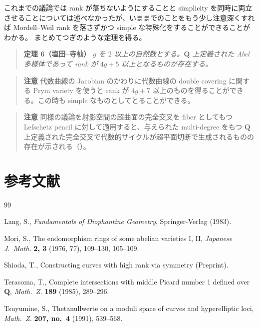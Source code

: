 \documentclass[uplatex,dvipdfmx]{jlreq}
\def\inbook#1{\textit{#1}}
\def\publ#1{#1}
\begin{document}
これまでの議論では rank が落ちないようにすることと simplicity を同時に両立させることについては述べなかったが、いままでのことをもう少し注意深くすれば Mordell--Weil rank を落さずかつ simple な特殊化をすることができることがわかる。
まとめてつぎのような定理を得る。

\begin{quote}
\textbf{定理 6（塩田--寺杣）}\quad
\textit{$g$ を $2$ 以上の自然数とする。$\mathbf{Q}$ 上定義された Abel 多様体であって rank が $4g + 5$ 以上となるものが存在する。}
\end{quote}

\begin{quote}
\textbf{注意}\quad
代数曲線の Jacobian のかわりに代数曲線の double covering に関する Prym variety を使うと rank が $4g + 7$ 以上のものを得ることができる。この時も simple なものとしてとることができる。
\end{quote}

\begin{quote}
\textbf{注意}\quad
同様の議論を射影空間の超曲面の完全交叉を fiber としてもつ Lefschetz pencil に対して適用すると、与えられた multi-degree をもつ $\mathbf{Q}$ 上定義された完全交叉で代数的サイクルが超平面切断で生成されるものの存在が示される（\cite{T}）。
\end{quote}


\section*{参考文献}

\begin{thebibliography}{99}

  Lang, S.,
  \inbook{Fundamentals of Diophantine Geometry},
  \publ{Springer-Verlag} (1983).

  Mori, S.,
  The endomorphism rings of some abelian varieties I, II,
  \textit{Japanese J.\ Math.}
  \textbf{2, 3} (1976, 77), 109--130, 105--109.

  Shioda, T.,
  Constructing curves with high rank via symmetry
  (Preprint).

  Terasoma, T.,
  Complete intersections with middle Picard number 1 defined over $\mathbf{Q}$,
  \textit{Math.\ Z.}
  \textbf{189} (1985), 289--296.

  Tsuyumine, S.,
  Thetanullwerte on a moduli space of curves and hyperelliptic loci,
  \textit{Math.\ Z.}
  \textbf{207, no.\ 4} (1991), 539--568.

\end{thebibliography}
\end{document}
